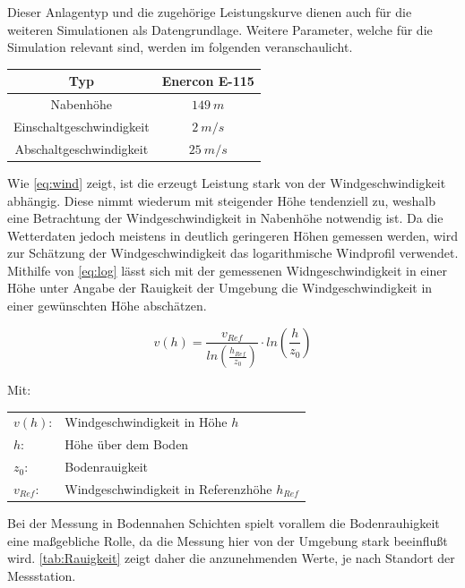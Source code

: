 Dieser Anlagentyp und die zugehörige Leistungskurve dienen auch für die weiteren Simulationen als Datengrundlage. Weitere Parameter, welche für die Simulation relevant sind, werden im folgenden veranschaulicht.

\begin{center}
	\begin{tabular}[htpb]{c|c}
		Typ & Enercon E-115 \\
		\hline
		Nabenhöhe & $149~m$ \\
		Einschaltgeschwindigkeit & $2~m/s$ \\
		Abschaltgeschwindigkeit & $25~m/s$
	\end{tabular}
\end{center}

Wie \autoref{eq:wind} zeigt, ist die erzeugt Leistung stark von der Windgeschwindigkeit abhängig. Diese nimmt wiederum mit steigender Höhe tendenziell zu, weshalb eine Betrachtung der Windgeschwindigkeit in Nabenhöhe notwendig ist. Da die Wetterdaten jedoch meistens in deutlich geringeren Höhen gemessen werden, wird zur Schätzung der Windgeschwindigkeit das logarithmische Windprofil verwendet. Mithilfe von \autoref{eq:log} lässt sich mit der gemessenen Widngeschwindigkeit in einer Höhe unter Angabe der Rauigkeit der Umgebung die Windgeschwindigkeit in einer gewünschten Höhe abschätzen. \cite{Hoehenprofil}

\begin{equation}
	v(h) = \frac{v_{Ref}}{ln\left(\frac{h_{Ref}}{z_0}\right)} \cdot ln\left(\frac{h}{z_0}\right)
	\label{eq:log}
\end{equation}

Mit:

\begin{flushleft}
	\begin{tabular}[htpb]{ll}
		$v(h)$: & Windgeschwindigkeit in Höhe $h$ \\
		$h$: & Höhe über dem Boden \\
		$z_0$: & Bodenrauigkeit \\
		$v_{Ref}$: & Windgeschwindigkeit in Referenzhöhe $h_{Ref}$ 
	\end{tabular}
\end{flushleft}

Bei der Messung in Bodennahen Schichten spielt vorallem die Bodenrauhigkeit eine maßgebliche Rolle, da die Messung hier von der Umgebung stark beeinflußt wird. \autoref{tab:Rauigkeit} zeigt daher die anzunehmenden Werte, je nach Standort der Messstation.  

